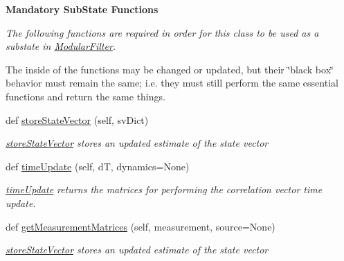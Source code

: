 \begin{Indent}{\bf Mandatory Sub\+State Functions}\par
{\em The following functions are required in order for this class to be used as a substate in \hyperlink{namespacemodest_1_1ModularFilter}{Modular\+Filter}.

The inside of the functions may be changed or updated, but their \char`\"{}black box\char`\"{} behavior must remain the same; i.\+e. they must still perform the same essential functions and return the same things. }\begin{DoxyCompactItemize}
\item 
def \hyperlink{classmodest_1_1substates_1_1CorrelationVector_1_1CorrelationVector_af028331d6cc55967055b9cf19499c5f2}{store\+State\+Vector} (self, sv\+Dict)
\begin{DoxyCompactList}\small\item\em \hyperlink{classmodest_1_1substates_1_1CorrelationVector_1_1CorrelationVector_af028331d6cc55967055b9cf19499c5f2}{store\+State\+Vector} stores an updated estimate of the state vector \end{DoxyCompactList}\item 
def \hyperlink{classmodest_1_1substates_1_1CorrelationVector_1_1CorrelationVector_a5eb64d242f27e54ed924a957238376b9}{time\+Update} (self, dT, dynamics=None)
\begin{DoxyCompactList}\small\item\em \hyperlink{classmodest_1_1substates_1_1CorrelationVector_1_1CorrelationVector_a5eb64d242f27e54ed924a957238376b9}{time\+Update} returns the matrices for performing the correlation vector time update. \end{DoxyCompactList}\item 
def \hyperlink{classmodest_1_1substates_1_1CorrelationVector_1_1CorrelationVector_a84cd9e342ef4e1d110bb8d76a8f45671}{get\+Measurement\+Matrices} (self, measurement, source=None)
\begin{DoxyCompactList}\small\item\em \hyperlink{classmodest_1_1substates_1_1CorrelationVector_1_1CorrelationVector_af028331d6cc55967055b9cf19499c5f2}{store\+State\+Vector} stores an updated estimate of the state vector \end{DoxyCompactList}\end{DoxyCompactItemize}
\end{Indent}
